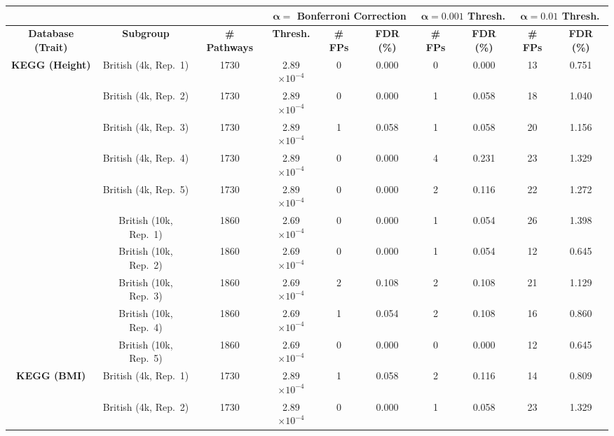 \documentclass[10pt]{article}
\begin{document}
\clearpage


\begin{landscape}
\setlength{\extrarowheight}{3pt}
\begin{table}[ht]
\centering
\vspace*{-1.5cm}
\hspace*{-2em}
\begin{tabular}{|c|c|c|ccc|cc|cc|}
  \hline
& & & \multicolumn{3}{c|}{\textbf{$\bm{\alpha =}$ Bonferroni Correction}} & \multicolumn{2}{c|}{\textbf{$\bm{\alpha = 0.001}$ Thresh.}} & \multicolumn{2}{c|}{\textbf{$\bm{\alpha = 0.01}$ Thresh.}}\\
\hline
\textbf{Database (Trait)} & \textbf{Subgroup} & \textbf{\# Pathways} & \textbf{Thresh.} & \textbf{\# FPs} & \textbf{FDR (\%)} & \textbf{\# FPs} & \textbf{FDR (\%)} &  \textbf{\# FPs} & \textbf{FDR (\%)} \\ 
  \hline
\multirow{10.5}{*}{\textbf{KEGG (Height)}} & British (4k, Rep.~1) & 1730 & 2.89$\times 10^{-4}$ & 0 & 0.000 & 0 & 0.000 & 13 & 0.751 \\
  & British (4k, Rep.~2) & 1730 & 2.89$\times 10^{-4}$ & 0 & 0.000 & 1 & 0.058 & 18 & 1.040 \\
  & British (4k, Rep.~3) & 1730 & 2.89$\times 10^{-4}$ & 1 & 0.058 & 1 & 0.058 & 20 & 1.156 \\
  & British (4k, Rep.~4) & 1730 & 2.89$\times 10^{-4}$ & 0 & 0.000 & 4 & 0.231 & 23 & 1.329 \\
  & British (4k, Rep.~5) & 1730 & 2.89$\times 10^{-4}$ & 0 & 0.000 & 2 & 0.116 & 22 & 1.272 \\
  & British (10k, Rep.~1) & 1860 & 2.69$\times 10^{-4}$ & 0 & 0.000 & 1 & 0.054 & 26 & 1.398 \\
  & British (10k, Rep.~2) & 1860 & 2.69$\times 10^{-4}$ & 0 & 0.000 & 1 & 0.054 & 12 & 0.645 \\
  & British (10k, Rep.~3) & 1860 & 2.69$\times 10^{-4}$ & 2 & 0.108 & 2 & 0.108 & 21 & 1.129 \\
  & British (10k, Rep.~4) & 1860 & 2.69$\times 10^{-4}$ & 1 & 0.054 & 2 & 0.108 & 16 & 0.860 \\
  & British (10k, Rep.~5) & 1860 & 2.69$\times 10^{-4}$ & 0 & 0.000 & 0 & 0.000 & 12 & 0.645 \\ 
  \hline
\multirow{10.5}{*}{\textbf{KEGG (BMI)}} & British (4k, Rep.~1) & 1730 & 2.89$\times 10^{-4}$ & 1 & 0.058 & 2 & 0.116 & 14 & 0.809 \\
  & British (4k, Rep.~2) & 1730 & 2.89$\times 10^{-4}$ & 0 & 0.000 & 1 & 0.058 & 23 & 1.329 \\

\end{tabular}
\end{table}
\end{landscape}
\end{document}
